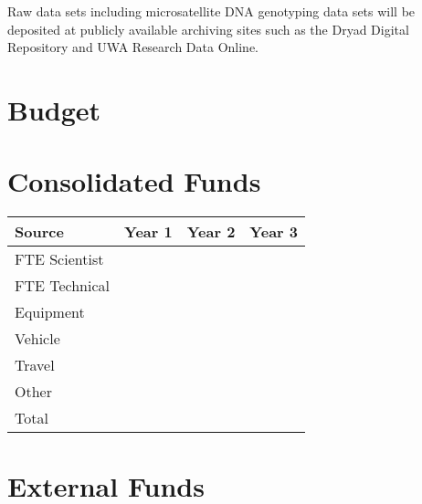 \documentclass[version=last,
    paper=a4,                               %
    10pt,                                   %
    dvipsnames,
    oneside,                              %
    headings=openany,                       %
    open=any,
    BCOR=7mm,                               %
    DIV=15,     %
]{scrbook}
\begin{document}
Raw data sets including microsatellite DNA genotyping data sets will be
deposited at publicly available archiving sites such as the Dryad
Digital Repository and UWA Research Data Online.




\section*{Budget}

\section*{Consolidated Funds }



\begin{longtabu} to \linewidth { |  X | X | X | X | }
\hline
{}
Source & Year 1 & Year 2 & Year 3\\
\hline
\endhead



FTE Scientist &  &  & \\



FTE Technical &  &  & \\



Equipment &  &  & \\



Vehicle &  &  & \\



Travel &  &  & \\



Other &  &  & \\



Total &  &  & \\


\hline
\end{longtabu}



\section*{External Funds }
\end{document}
